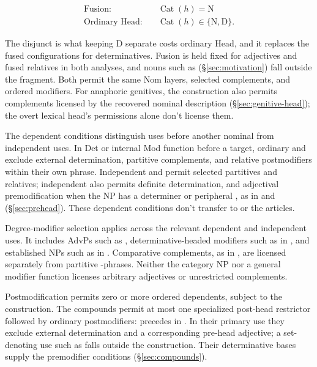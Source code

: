 \documentclass[12pt]{article}
\begin{document}
\[
\begin{aligned}
\text{Fusion:} &\quad \operatorname{Cat}(h)=\mathrm{N} \\
\text{Ordinary Head:} &\quad \operatorname{Cat}(h)\in\{\mathrm{N},\mathrm{D}\}.
\end{aligned}
\]

The disjunct is what keeping D separate costs ordinary Head, and it replaces the fused configurations for determinatives. Fusion is held fixed for adjectives and fused relatives in both analyses, and nouns such as  (§\ref{sec:motivation}) fall outside the fragment. Both permit the same Nom layers, selected complements, and ordered modifiers. For anaphoric genitives, the construction also permits complements licensed by the recovered nominal description (§\ref{sec:genitive-head}); the overt lexical head's permissions alone don't license them.

The dependent conditions distinguish uses before another nominal from independent uses. In Det or internal Mod function before a target, ordinary  and  exclude external determination, partitive complements, and relative postmodifiers within their own phrase. Independent  and  permit selected partitives and relatives; independent  also permits definite determination, and adjectival premodification when the NP has a determiner or peripheral , as in  and  (§\ref{sec:prehead}). These dependent conditions don't transfer to  or the articles.

Degree-modifier selection applies across the relevant dependent and independent uses. It includes AdvPs such as , determinative-headed modifiers such as  in , and established NPs such as  in . Comparative complements, as in , are licensed separately from partitive -phrases. Neither the category NP nor a general modifier function licenses arbitrary adjectives or unrestricted complements.

Postmodification permits zero or more ordered dependents, subject to the construction. The compounds permit at most one specialized post-head restrictor followed by ordinary postmodifiers:  precedes  in . In their primary use they exclude external determination and a corresponding pre-head adjective; a set-denoting use such as  falls outside the construction. Their determinative bases supply the premodifier conditions (§\ref{sec:compounds}).
\end{document}
